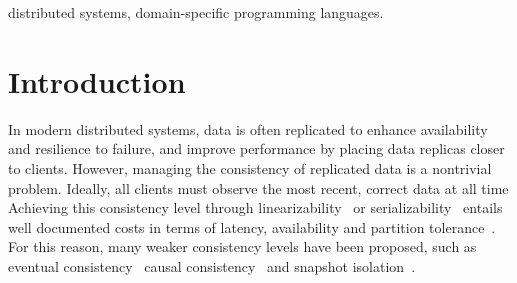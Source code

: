 \documentclass[preprint, numbers]{sigplanconf}
\begin{document}
\keywords
distributed systems, domain-specific programming languages.

\section{Introduction}
In modern distributed systems, data is often replicated 
to enhance availability and resilience to failure, and improve performance by
placing data replicas closer to clients. However, managing the consistency of 
replicated data is a nontrivial problem. Ideally, all clients must observe the most recent, correct data at all time 
Achieving this consistency level through linearizability~\cite{herlihy1990linearizability} or
serializability~\cite{papadimitriou1979serializability} entails well
documented costs in terms of latency, availability and partition
tolerance~\cite{bailis2013highly, kraska2013mdcc}. For this reason, many weaker consistency levels have been proposed,
such as eventual consistency~\cite{vogels2009eventually} causal
consistency~\cite{lamport1978time} and snapshot isolation~\cite{kemme2000database}.
\end{document}
